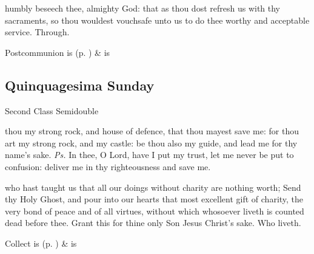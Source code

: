 
\postcommunion
{} humbly beseech thee, almighty God: that as thou dost refresh us with thy sacraments, so thou wouldest vouchsafe unto us to do thee worthy and acceptable service. Through.
\begin{rubric}
     Postcommunion is  (p. \pageref{SPSaints}) \&  is 
\end{rubric}

\subsection{Quinquagesima Sunday}
\begin{inhead}
{Second Class Semidouble}
\end{inhead}


\introit
{} thou my strong rock, and house of defence, that thou mayest save me: for thou art my strong rock, and my castle: be thou also my guide, and lead me for thy name's sake. \textit{Ps.} In thee, O Lord, have I put my trust, let me never be put to confusion: deliver me in thy righteousness and save me.

\collect
{} who hast taught us that all our doings without charity are nothing worth; Send thy Holy Ghost, and pour into our hearts that most excellent gift of charity, the very bond of peace and of all virtues, without which whosoever liveth is counted dead before thee. Grant this for thine only Son Jesus Christ's sake. Who liveth.
\begin{rubric}
     Collect is  (p. \pageref{SPSaints}) \&  is 
\end{rubric}

